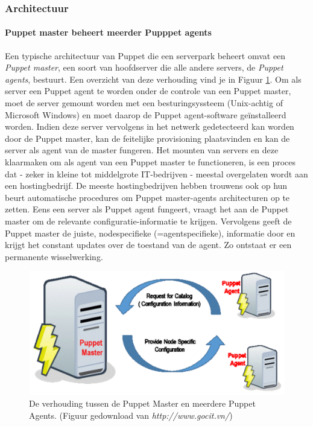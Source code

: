 \documentclass[a4paper,11pt]{article}
\theoremstyle{definition}
\begin{document}
\subsubsection{Architectuur}
\paragraph{Puppet master beheert meerder Pupppet agents}
Een typische architectuur van Puppet die een serverpark beheert omvat een \emph{Puppet master}, een soort 
van hoofdserver die alle andere servers, de \emph{Puppet agents}, bestuurt. Een 
overzicht van deze verhouding vind je in Figuur \ref{overzicht}. Om als server een Puppet agent te 
worden onder de controle van een Puppet master, moet de server gemount worden 
met een besturingsyssteem (Unix-achtig of Microsoft Windows) en moet daarop de 
Puppet agent-software geïnstalleerd worden. Indien deze server vervolgens in 
het netwerk gedetecteerd kan worden door de Puppet master, kan de 
feitelijke provisioning plaatsvinden en kan de server als agent van de master fungeren. Het mounten van servers en deze klaarmaken 
om als agent van een Puppet master te functioneren, is een proces dat - zeker in kleine tot middelgrote IT-bedrijven - meestal overgelaten 
wordt aan een hostingbedrijf. De meeste hostingbedrijven hebben trouwens ook op hun beurt 
automatische procedures om Puppet master-agents architecturen op te zetten. Eens 
een server als Puppet agent fungeert, vraagt het aan de Puppet master om de 
relevante configuratie-informatie te krijgen. Vervolgens geeft de Puppet master 
de juiste, nodespecifieke (=agentspecifieke), informatie door en krijgt het constant updates over de toestand van de 
agent. Zo ontstaat er een permanente wisselwerking.
\begin{figure}[h]
  \centering
  \includegraphics[scale=0.4]{puppetoverzicht.pdf}\caption{De verhouding tussen de Puppet Master en meerdere Puppet Agents. (Figuur gedownload van \emph{http://www.gocit.vn/})}\label{overzicht}
\end{figure}
\end{document}
